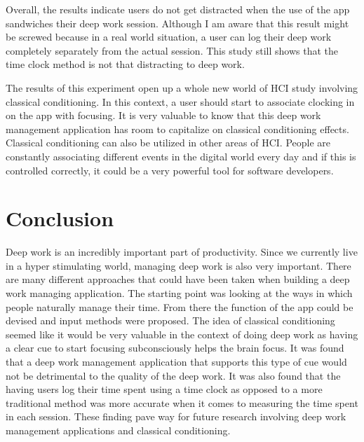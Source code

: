 \documentclass[sigconf]{acmart}
\begin{document}
Overall, the results indicate users do not get distracted when the use of the app sandwiches their deep work session. Although I am aware that this result might be screwed because in a real world situation, a user can log their deep work completely separately from the actual session. This study still shows that the time clock method is not that distracting to deep work. 

The results of this experiment open up a whole new world of HCI study involving classical conditioning. In this context, a user should start to associate clocking in on the app with focusing. It is very valuable to know that this deep work management application has room to capitalize on classical conditioning effects. Classical conditioning can also be utilized in other areas of HCI. People are constantly associating different events in the digital world every day and if this is controlled correctly, it could be a very powerful tool for software developers. 



\section{Conclusion}
Deep work is an incredibly important part of productivity. Since we currently live in a hyper stimulating world, managing deep work is also very important. There are many different approaches that could have been taken when building a deep work managing application. The starting point was looking at the ways in which people naturally manage their time. From there the function of the app could be devised and input methods were proposed. The idea of classical conditioning seemed like it would be very valuable in the context of doing deep work as having a clear cue to start focusing subconsciously helps the brain focus. It was found that a deep work management application that supports this type of cue would not be detrimental to the quality of the deep work. It was also found that the having users log their time spent using a time clock as opposed to a more traditional method was more accurate when it comes to measuring the time spent in each session. These finding pave way for future research involving deep work management applications and classical conditioning.
\end{document}
